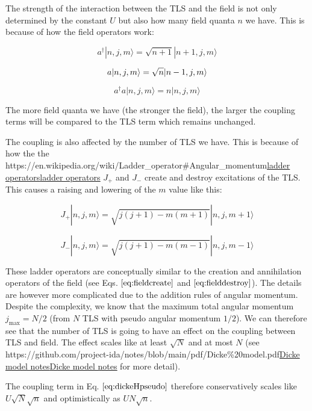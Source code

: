 \documentclass[
]{article}
\let\oldhref\href
\renewcommand{\href}[2]{\ifx#1\urlprefix\oldhref{#1}{#2}\else\uline{\oldhref{#1}{#2}}\fi}
\renewcommand{\[}{\begin{equation}}
\renewcommand{\]}{\end{equation}}
\begin{document}
The strength of the interaction between the TLS and the field is not
only determined by the constant \(U\) but also how many field quanta
\(n\) we have. This is because of how the field operators work:

\[
a^{\dagger} |n,j,m\rangle = \sqrt{n+1}|n+1,j,m\rangle
\label{eq:fieldcreate}
\]

\[
a |n,j,m\rangle = \sqrt{n}|n-1,j,m\rangle \\
\label{eq:fielddestroy}
\]

\[
a^{\dagger}a |n,j,m\rangle = n|n,j,m\rangle
\]

The more field quanta we have (the stronger the field), the larger the
coupling terms will be compared to the TLS term which remains unchanged.

The coupling is also affected by the number of TLS we have. This is
because of how the the
\href{https://en.wikipedia.org/wiki/Ladder_operator\#Angular_momentum}{ladder
operators} \(J_{+}\) and \(J_{-}\) create and destroy excitations of the
TLS. This causes a raising and lowering of the \(m\) value like this:

\[
J_+ |n, j, m\rangle  =  \sqrt{j(j + 1) - m(m + 1)} |n, j, m + 1\rangle
\]

\[
J_- |n, j, m\rangle =  \sqrt{j(j + 1) - m(m - 1)} |n, j, m - 1\rangle
\]

These ladder operators are conceptually similar to the creation and
annihilation operators of the field (see Eqs. \(\ref{eq:fieldcreate}\)
and \(\ref{eq:fielddestroy}\)). The details are however more complicated
due to the addition rules of angular momentum. Despite the complexity,
we know that the maximum total angular momentum \(j_{\max} = N/2\) (from
\(N\) TLS with pseudo angular momentum \(1/2\)). We can therefore see
that the number of TLS is going to have an effect on the coupling
between TLS and field. The effect scales like at least \(\sqrt{N}\) and
at most \(N\) (see
\href{https://github.com/project-ida/notes/blob/main/pdf/Dicke\%20model.pdf}{Dicke
model notes} for more detail).

The coupling term in Eq. \(\ref{eq:dickeHpseudo}\) therefore
conservatively scales like \(U\sqrt{N}\sqrt{n}\) and optimistically as
\(UN\sqrt{n}\).

\printbibliography
\end{document}
